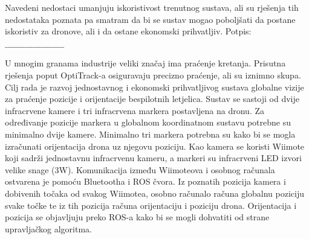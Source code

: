 \documentclass[times, utf8, diplomski]{fer}
\begin{document}
Navedeni nedostaci umanjuju iskoristivost trenutnog sustava, ali su rješenja tih nedostataka poznata pa smatram da bi se sustav mogao poboljšati da postane iskoristiv za dronove, ali i da ostane ekonomski prihvatljiv.
\vfill
\hspace*{0pt}\hfill Potpis: $\_\_\_\_\_\_\_\_\_\_\_\_\_\_\_\_\_\_\_\_\_$





\begin{sazetak}
U mnogim granama industrije veliki značaj ima praćenje kretanja. Prisutna rješenja poput OptiTrack-a osiguravaju precizno praćenje, ali su iznimno skupa. Cilj rada je razvoj jednostavnog i ekonomski prihvatljivog sustava globalne vizije za praćenje pozicije i orijentacije bespilotnih letjelica. Sustav se sastoji od dvije infracrvene kamere i tri infracrvena markera postavljena na dronu. Za određivanje pozicije markera u globalnom koordinatnom sustavu potrebne su minimalno dvije kamere. Minimalno tri markera potrebna su kako bi se mogla izračunati orijentacija drona uz njegovu poziciju. Kao kamera se koristi Wiimote koji sadrži jednostavnu infracrvenu kameru, a markeri su infracrveni LED izvori velike snage (3W). Komunikacija između Wiimoteova i osobnog računala ostvarena je pomoću Bluetootha i ROS čvora. Iz poznatih pozicija kamera i dobivenih točaka od svakog Wiimotea, osobno računalo računa globalnu poziciju svake točke te iz tih pozicija računa orijentaciju i poziciju drona. Orijentacija i pozicija se objavljuju preko ROS-a kako bi se mogli dohvatiti od strane upravljačkog algoritma. 

\end{sazetak}
\newpage
\end{document}
